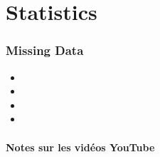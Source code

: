 \documentclass[12pt, titlepage, french]{report}
\begin{document}

\tableofcontents

\clearpage

\part*{Statistics}

\section*{Missing Data}

\begin{YTB_vids}
\begin{itemize}
	\item	{}
	\item	{}
	\item	{}
	\item	
\end{itemize}
\end{YTB_vids}

\subsection*{Notes sur les vidéos YouTube}
\end{document}
